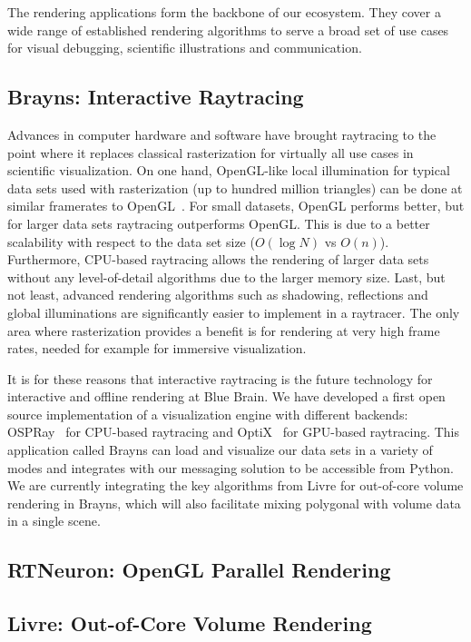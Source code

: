 \documentclass[10pt]{llncs}
\newcommand{\FIXME}[1]{\textbf{\color{BLUE}{FIXME: #1}}}
\begin{document}
The rendering applications form the backbone of our ecosystem. They cover a
wide range of established rendering algorithms to serve a broad set of use
cases for visual debugging, scientific illustrations and communication.

\subsection{Brayns: Interactive Raytracing}

Advances in computer hardware and software have brought raytracing to the point
where it replaces classical rasterization for virtually all use cases in
scientific visualization. On one hand, OpenGL-like local illumination for
typical data sets used with rasterization (up to hundred million triangles) can
be done at similar framerates to OpenGL~\cite{ospray}. For small datasets,
OpenGL performs better, but for larger data sets raytracing outperforms OpenGL.
This is due to a better scalability with respect to the data set size
($O(\log{N})$ vs $O(n)$). Furthermore, CPU-based raytracing allows the rendering
of larger data sets without any level-of-detail algorithms due to the larger
memory size. Last, but not least, advanced rendering algorithms such as
shadowing, reflections and global illuminations are significantly easier to
implement in a raytracer. The only area where rasterization provides a benefit
is for rendering at very high frame rates, needed for example for immersive
visualization.

It is for these reasons that interactive raytracing is the future technology for
interactive and offline rendering at Blue Brain. We have developed a first open
source implementation of a visualization engine with different backends:
OSPRay~\cite{ospray} for CPU-based raytracing and OptiX~\cite{optix} for
GPU-based raytracing. This application called Brayns can load and visualize our
data sets in a variety of modes and integrates with our messaging solution to be
accessible from Python. We are currently integrating the key algorithms from
Livre for out-of-core volume rendering in Brayns, which will also facilitate
mixing polygonal with volume data in a single scene.

\FIXME{teaser gallery}

\subsection{RTNeuron: OpenGL Parallel Rendering}

\subsection{Livre: Out-of-Core Volume Rendering}
\end{document}
